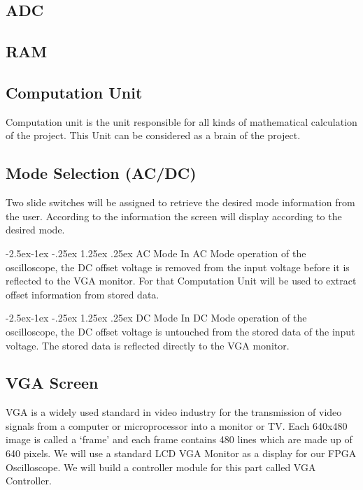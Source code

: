 \documentclass[paper]{IEEEtran}
\makeatletter
\renewcommand\paragraph{\@startsection{paragraph}{4}{\z@}%
            {-2.5ex\@plus -1ex \@minus -.25ex}%
            {1.25ex \@plus .25ex}%
            {\normalfont\normalsize\bfseries}}
\makeatother
\begin{document}
\subsection{ADC} \- \indent
	

\subsection{RAM} \- \indent

\subsection{Computation Unit} \- \indent
	Computation unit is the unit responsible for all kinds of mathematical calculation of the project. This Unit can be considered as a brain of the project. 

\subsection{Mode Selection (AC/DC)} \- \indent
	Two slide switches will be assigned to retrieve the desired mode information from the user. According to the information the screen will display according to the desired mode.

\paragraph{AC Mode} \- \indent
	In AC Mode operation of the oscilloscope, the DC offset voltage is removed from the input voltage before it is reflected to the VGA monitor. For that Computation Unit will be used to extract offset information from stored data.

\paragraph{DC Mode} \- \indent
	In DC Mode operation of the oscilloscope, the DC offset voltage is untouched from the stored data of the input voltage. The stored data is reflected directly to the VGA monitor. 
	

\subsection{VGA Screen} \- \indent
	VGA is a widely used standard in video industry for the transmission of video signals from a computer or microprocessor into a monitor or TV. Each 640x480 image is called a ‘frame’ and each frame contains 480 lines which are made up of 640 pixels. We will use a standard LCD VGA Monitor as a display for our FPGA Oscilloscope. We will build a controller module for this part called VGA Controller. 
	
\end{document}
